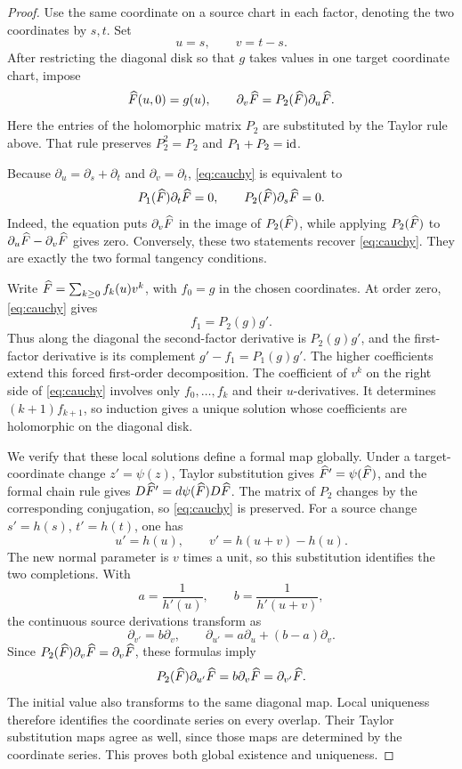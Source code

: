 \begin{proof}
Use the same coordinate on a source chart in each factor, denoting
the two coordinates by \(s,t\). Set
\[
u=s,\qquad v=t-s.
\]
After restricting the diagonal disk so that \(g\) takes values in
one target coordinate chart, impose
\begin{equation}\label{eq:cauchy}
\widehat F(u,0)=g(u),\qquad
\partial_v\widehat F=P_2(\widehat F)\partial_u\widehat F.
\end{equation}
Here the entries of the holomorphic matrix \(P_2\) are substituted
by the Taylor rule above. That rule preserves \(P_2^2=P_2\) and
\(P_1+P_2=\operatorname{id}\).

Because \(\partial_u=\partial_s+\partial_t\) and
\(\partial_v=\partial_t\), \eqref{eq:cauchy} is equivalent to
\[
P_1(\widehat F)\partial_t\widehat F=0,\qquad
P_2(\widehat F)\partial_s\widehat F=0.
\]
Indeed, the equation puts \(\partial_v\widehat F\) in the image of
\(P_2(\widehat F)\), while applying \(P_2(\widehat F)\) to
\(\partial_u\widehat F-\partial_v\widehat F\) gives zero. Conversely,
these two statements recover \eqref{eq:cauchy}. They are exactly
the two formal tangency conditions.

Write \(\widehat F=\sum_{k\ge0}f_k(u)v^k\), with \(f_0=g\) in the
chosen coordinates. At order zero, \eqref{eq:cauchy} gives
\[
f_1=P_2(g)g'.
\]
Thus along the diagonal the second-factor derivative is
\(P_2(g)g'\), and the first-factor derivative is its complement
\(g'-f_1=P_1(g)g'\). The higher coefficients extend this forced
first-order decomposition. The coefficient of \(v^k\) on the
right side of \eqref{eq:cauchy} involves only
\(f_0,\ldots,f_k\) and their \(u\)-derivatives. It determines
\((k+1)f_{k+1}\), so induction gives a unique solution whose
coefficients are holomorphic on the diagonal disk.

We verify that these local solutions define a formal map globally.
Under a target-coordinate change \(z'=\psi(z)\), Taylor substitution
gives \(\widehat F'=\psi(\widehat F)\), and the formal chain rule gives
\(D\widehat F'=d\psi(\widehat F)D\widehat F\). The matrix of \(P_2\) changes
by the corresponding conjugation, so \eqref{eq:cauchy} is preserved.
For a source change \(s'=h(s)\), \(t'=h(t)\), one has
\[
u'=h(u),\qquad v'=h(u+v)-h(u).
\]
The new normal parameter is \(v\) times a unit, so this substitution
identifies the two completions. With
\[
a=\frac1{h'(u)},\qquad b=\frac1{h'(u+v)},
\]
the continuous source derivations transform as
\[
\partial_{v'}=b\partial_v,\qquad
\partial_{u'}=a\partial_u+(b-a)\partial_v.
\]
Since \(P_2(\widehat F)\partial_v\widehat F=\partial_v\widehat F\), these
formulas imply
\[
P_2(\widehat F)\partial_{u'}\widehat F
 =b\partial_v\widehat F=\partial_{v'}\widehat F.
\]
The initial value also transforms to the same diagonal map. Local
uniqueness therefore identifies the coordinate series on every
overlap. Their Taylor substitution maps agree as well, since those
maps are determined by the coordinate series. This proves both
global existence and uniqueness.
\end{proof}

